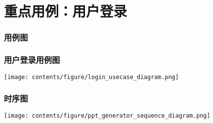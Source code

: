 \section{重点用例：用户登录}
\begin{frame}
    \frametitle{用例图}
    \frametitle{用户登录用例图}
    \center
    \texttt{[image: contents/figure/login\_usecase\_diagram.png]}
\end{frame}
\begin{frame}
    \frametitle{时序图}
    \center
    \texttt{[image: contents/figure/ppt\_generator\_sequence\_diagram.png]}
\end{frame}
